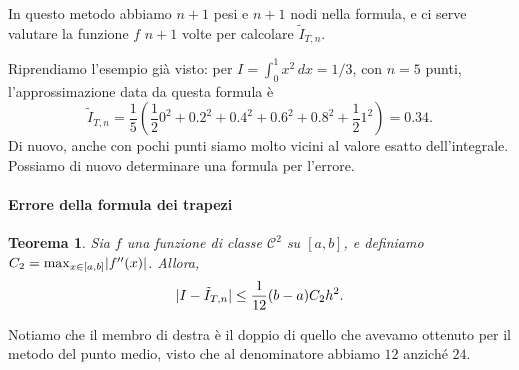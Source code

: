 \documentclass[a4paper]{report}
\DeclarePairedDelimiter{\abs}{\lvert}{\rvert}
\newtheorem{theorem}{Teorema}[chapter]
\theoremstyle{definiton}
\theoremstyle{remark}
\begin{document}
In questo metodo abbiamo $n+1$ pesi e $n+1$ nodi nella formula, e ci serve valutare la funzione $f$ $n+1$ volte per calcolare $\tilde{I}_{T,n}$.

Riprendiamo l'esempio già visto: per $I = \int_0^1 x^2\, dx = 1/3$, con $n=5$ punti, l'approssimazione data da questa formula è
\begin{equation} \label{esempio trapezi composito}
    \tilde{I}_{T,n} = \frac{1}{5} \left(\frac{1}{2}0^2 + 0.2^2 + 0.4^2 + 0.6^2 + 0.8^2 + \frac{1}{2}1^2\right) = 0.34.    
\end{equation}
Di nuovo, anche con pochi punti siamo molto vicini al valore esatto dell'integrale. Possiamo di nuovo determinare una formula per l'errore.

\paragraph{Errore della formula dei trapezi} 
\begin{theorem}
    Sia $f$ una funzione di classe $\mathcal{C}^2$ su $[a,b]$, e definiamo $C_2 = \max_{x\in [a,b]} \abs{f''(x)}$. Allora,
    \begin{equation} \label{trapezoid formula error}
        \abs{I - \tilde{I}_{T,n}} \leq \frac{1}{12} (b-a) C_2 h^2.
    \end{equation}
\end{theorem}
Notiamo che il membro di destra è il doppio di quello che avevamo ottenuto per il metodo del punto medio, visto che al denominatore abbiamo $12$ anziché $24$.
\end{document}
